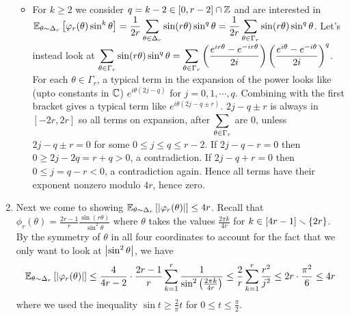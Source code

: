 \begin{enumerate}[label=(\alph*)]
\begin{itemize}
\item For $k\ge 2$ we consider $q=k-2 \in [0,r-2]\cap \mathbb{Z}$ and are interested in $\displaystyle \mathbb E_{\theta\sim \Delta_{r}}\left[\varphi_{r}(\theta)\sin^{k}\theta\right] = \frac{1}{2r}\sum_{\theta\in\Delta_{r}}\sin(r\theta)\sin^{q}\theta = \frac{1}{2r}\sum_{\theta\in\Gamma_{r}}\sin(r\theta)\sin^{q}\theta$. Let's instead look at $\displaystyle\sum_{\theta\in\Gamma_{r}}\sin(r\theta)\sin^{q}\theta = \sum_{\theta\in\Gamma_{r}}\left(\frac{e^{ir\theta}-e^{-ir\theta}}{2i}\right)\left(\frac{e^{i\theta}-e^{-i\theta}}{2i}\right)^{q}$. For each $\theta\in \Gamma_{r}$, a typical term in the expansion of the power looks like (upto constants in $\mathbb{C}$) $e^{i\theta(2j-q)}$ for $j=0,1,\cdots,q$. Combining with the first bracket gives a typical term like $e^{i\theta(2j-q \pm r)}$. $2j-q \pm r$ is always in $[-2r,2r]$ so all terms on expansion, after $\displaystyle\sum_{\theta\in\Gamma_{r}}$ are $0$, unless $2j-q \pm r=0$ for some $0\le j \le q \le r-2$. If $2j-q-r = 0$ then $0 \ge 2j-2q = r+q > 0$, a contradiction. If $2j-q+r = 0$ then $0 \le j = q-r < 0$, a contradiction again. Hence all terms have their exponent nonzero modulo $4r$, hence zero. 
\end{itemize}
\item Next we come to showing $\displaystyle\mathbb E_{\theta\sim \Delta_{r}}\left[\left| \varphi_{r}(\theta) \right|\right] \le 4r$. Recall that $\phi_{r}(\theta) = \frac{2r-1}{r} \frac{\sin(r\theta)}{\sin^{2}\theta}$ where $\theta$ takes the values $\frac{2\pi k}{4r}$ for $k\in [4r-1]\smallsetminus\left\{2r\right\}$. By the symmetry of $\theta$ in all four coordinates to account for the fact that we only want to look at $\left| \sin^{2}\theta \right|$, we have $$\mathbb E_{\theta\sim \Delta_{r}}\left[\left| \varphi_{r}(\theta) \right|\right] \le \frac{4}{4r-2}\cdot\frac{2r-1}{r}\sum_{k=1}^{r}\frac{1}{\sin^{2}\left(\frac{2\pi k}{4r}\right)} \le \frac{2}{r}\sum_{k=1}^{r}\frac{r^{2}}{j^{2}} \le 2r\cdot \frac{\pi^{2}}{6} \le 4r$$ where we used the inequality $\sin t \ge \frac2\pi t$ for $0\le t\le \frac\pi2$.
\end{enumerate}


